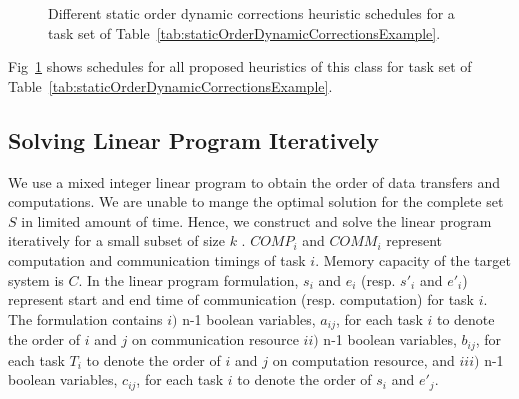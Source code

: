 \documentclass[sigconf]{acmart}
\begin{document}
\begin{figure}[htb]
	\caption{ \label{fig:staticOrderDynamicCorrectionsExample} Different static order dynamic corrections heuristic schedules for a task set of Table~\ref{tab:staticOrderDynamicCorrectionsExample}.}
\end{figure} 



Fig~\ref{fig:staticOrderDynamicCorrectionsExample} shows schedules for all proposed heuristics of this class for task set of Table~\ref{tab:staticOrderDynamicCorrectionsExample}.




\subsection{Solving Linear Program Iteratively}
\label{subsec:linearprogrammingformulation}
We use a mixed integer linear program  to obtain the order of data transfers and computations. We are unable to mange the optimal solution for the complete set $S$ in limited amount of time.  Hence, we construct and solve the linear program iteratively for a small subset of size $k$ . $COMP_i$ and $COMM_i$ represent computation and communication timings of task $i$. Memory capacity of the  target system is $C$. In the linear program formulation, $s_i$ and $e_i$ (resp. $s'_i$ and $e'_i$) represent start and end time of communication (resp. computation) for task $i$. The formulation contains $i)$ n-1 boolean variables, $a_{ij}$, for each task $i$ to denote the order of $i$ and $j$  on communication resource   $ii)$ n-1 boolean variables, $b_{ij}$, for each task $T_i$ to denote the order of $i$ and $j$  on computation resource, and $iii)$ n-1 boolean variables, $c_{ij}$, for each task $i$ to denote the order of $s_i$ and $e'_j$.


\end{document}
